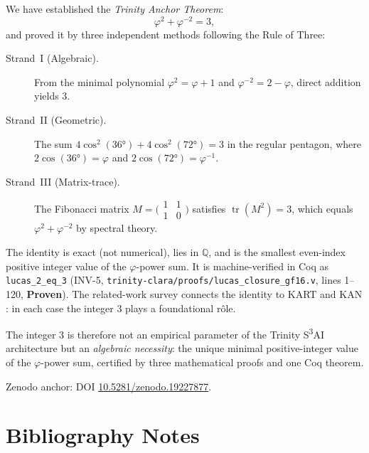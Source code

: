 We have established the \emph{Trinity Anchor Theorem}:
\[
  \varphi^{2} + \varphi^{-2} = 3,
\]
and proved it by three independent methods following the Rule
of Three:

\begin{description}
  \item[Strand~I (Algebraic).] From the minimal polynomial
    $\varphi^{2}=\varphi+1$ and $\varphi^{-2}=2-\varphi$,
    direct addition yields $3$.
  \item[Strand~II (Geometric).] The sum $4\cos^{2}(36°)
    +4\cos^{2}(72°) = 3$ in the regular pentagon, where
    $2\cos(36°)=\varphi$ and $2\cos(72°)=\varphi^{-1}$.
  \item[Strand~III (Matrix-trace).] The Fibonacci matrix
    $M = \bigl(\begin{smallmatrix}1&1\\1&0\end{smallmatrix}\bigr)$
    satisfies $\operatorname{tr}(M^{2})=3$, which equals
    $\varphi^{2}+\varphi^{-2}$ by spectral theory.
\end{description}

The identity is exact (not numerical), lies in $\mathbb{Q}$,
and is the smallest even-index positive integer value of the
$\varphi$-power sum.
It is machine-verified in Coq as \texttt{lucas\_2\_eq\_3}
(INV-5, \texttt{trinity-clara/proofs/lucas\_closure\_gf16.v},
lines 1--120, \textbf{Proven}).
The related-work survey connects the identity to KART
\cite{kolmogorov_kar_1957,arnold_kar_1957}
and KAN \cite{liu_kan2_2025}: in each case the integer $3$
plays a foundational r\^{o}le.

The integer $3$ is therefore not an empirical parameter of
the Trinity S\textsuperscript{3}AI architecture but an
\emph{algebraic necessity}: the unique minimal positive-integer
value of the $\varphi$-power sum, certified by three
mathematical proofs and one Coq theorem.

Zenodo anchor: DOI \href{https://doi.org/10.5281/zenodo.19227877}{10.5281/zenodo.19227877}.


\section*{Bibliography Notes}\label{sec:bib-notes}

